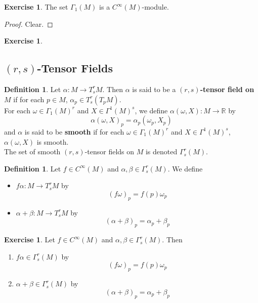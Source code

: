 \documentclass[12pt]{amsart}
\theoremstyle{definition}
\newtheorem{defn}[definition]{Definition}
\newtheorem{ex}[definition]{Exercise}
\newcommand{\al}{\alpha}
\newcommand{\Gam}{\Gamma}
\newcommand{\bet}{\beta}
\newcommand{\om}{\omega}
\newcommand{\R}{\mathbb{R}}
\begin{document}
	\begin{ex}
	The set $\Gam_1(M)$ is a $C^{\infty}(M)$-module.
	\end{ex}
	
	\begin{proof}
	Clear.
	\end{proof}
	
	
	\begin{ex}
	
	\end{ex}
	
	
	
	
	
	
	
	
	\newpage
	\subsection{$(r,s)$-Tensor Fields}
	
	\begin{defn}
		Let $\al: M \rightarrow T^r_sM$. Then $\al$ is said to be a \textbf{$(r,s)$-tensor field on $M$} if for each $p \in M$, $\al_p \in T^r_s(T_pM)$. \\
		For each $\om \in \Gam_1(M)^r$ and $X \in \Gam^1(M)^s$, we define $\al(\om, X) : M \rightarrow \R$ by $$\al(\om, X)_p = \al_p(\om_p, X_p)$$
		and $\al$ is said to be \textbf{smooth} if for each $\om \in \Gam_1(M)^r$ and $X \in \Gam^1(M)^s$, $\al(\om, X)$ is smooth. \\
		The set of smooth $(r,s)$-tensor fields on $M$ is denoted $\Gam^r_s(M)$.\\
	\end{defn}

	\begin{defn}
	Let $f \in C^{\infty}(M)$ and $\al,\bet \in \Gam^r_s(M)$. We define 
	\begin{itemize}
	\item $f\al: M \rightarrow T^r_sM$ by $$(f\om)_p = f(p)\om_p$$
	\item $\al+\bet:  M \rightarrow T^r_sM$ by $$(\al+\bet)_p = \al_p+\bet_p$$
	\end{itemize}
	\end{defn}
	
	\begin{ex}
	Let $f \in C^{\infty}(M)$ and $\al,\bet \in \Gam^r_s(M)$. Then
	\begin{enumerate}
	\item $f\al \in \Gam^r_s(M)$ by $$(f\om)_p = f(p)\om_p$$
	\item $\al+\bet \in \Gam^r_s(M)$ by $$(\al+\bet)_p = \al_p+\bet_p$$
	\end{enumerate}
	\end{ex}
	
\end{document}
